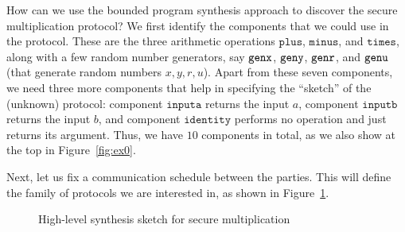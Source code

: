 \documentclass[preprint]{sig-alternate-05-2015}
\begin{document}
How can we use the bounded program synthesis approach to discover the
secure multiplication protocol?
We first identify the components that we could use in the protocol.
These are the three arithmetic operations 
$\mathtt{plus}$, 
$\mathtt{minus}$, and $\mathtt{times}$, along with
a few random number generators, say 
$\mbox{${\mathtt{genx}}$}$,
$\mbox{${\mathtt{geny}}$}$,
$\mbox{${\mathtt{genr}}$}$, and
$\mbox{${\mathtt{genu}}$}$ (that generate random numbers $x,y,r,u$).
Apart from these seven components, we need three more components that help
in specifying the ``sketch'' of the (unknown) protocol:
component $\mathtt{inputa}$ returns the input $a$,
component $\mathtt{inputb}$ returns the input $b$,
and
component $\mathtt{identity}$ performs no operation and just returns
its argument. Thus, we have $10$ components in total, as we also
show at the top in Figure~\ref{fig:ex0}.

Next, let us fix a communication schedule between the parties.
This will define the family of protocols we are interested 
in, as shown in Figure~\ref{fig:example-topology}.

\begin{figure}
\centering
{}
\label{fig:example-topology}
\caption{High-level synthesis sketch for secure multiplication}
\end{figure}
\end{document}
